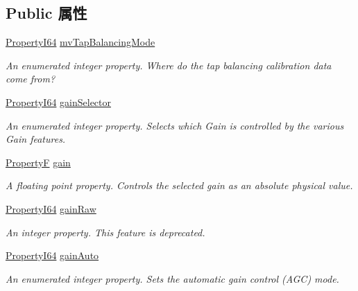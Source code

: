 \subsection*{Public 属性}
\begin{DoxyCompactItemize}
\item 
\hyperlink{group___common_interface_ga81749b2696755513663492664a18a893}{Property\+I64} \hyperlink{classmv_i_m_p_a_c_t_1_1acquire_1_1_gen_i_cam_1_1_analog_control_afaaf7d83e7278f824bec3635c01b8528}{mv\+Tap\+Balancing\+Mode}
\begin{DoxyCompactList}\small\item\em An enumerated integer property. Where do the tap balancing calibration data come from? \end{DoxyCompactList}\item 
\hyperlink{group___common_interface_ga81749b2696755513663492664a18a893}{Property\+I64} \hyperlink{classmv_i_m_p_a_c_t_1_1acquire_1_1_gen_i_cam_1_1_analog_control_a48fb299bea5b80eb2e113ba4f28fd489}{gain\+Selector}
\begin{DoxyCompactList}\small\item\em An enumerated integer property. Selects which Gain is controlled by the various Gain features. \end{DoxyCompactList}\item 
\hyperlink{group___common_interface_gaf54865fe5a3d5cfd15f9a111b40d09f9}{Property\+F} \hyperlink{classmv_i_m_p_a_c_t_1_1acquire_1_1_gen_i_cam_1_1_analog_control_abe8ee050e6f59ab940cdd1c3e6ddafae}{gain}
\begin{DoxyCompactList}\small\item\em A floating point property. Controls the selected gain as an absolute physical value. \end{DoxyCompactList}\item 
\hyperlink{group___common_interface_ga81749b2696755513663492664a18a893}{Property\+I64} \hyperlink{classmv_i_m_p_a_c_t_1_1acquire_1_1_gen_i_cam_1_1_analog_control_ade519853cab79cfd6c2ac5564d9ed568}{gain\+Raw}
\begin{DoxyCompactList}\small\item\em An integer property. This feature is deprecated. \end{DoxyCompactList}\item 
\hyperlink{group___common_interface_ga81749b2696755513663492664a18a893}{Property\+I64} \hyperlink{classmv_i_m_p_a_c_t_1_1acquire_1_1_gen_i_cam_1_1_analog_control_a2ba45ff2973f5d1f3817fdb237d1de3e}{gain\+Auto}
\begin{DoxyCompactList}\small\item\em An enumerated integer property. Sets the automatic gain control (A\+G\+C) mode. \end{DoxyCompactList}\item 

\end{DoxyCompactItemize}
